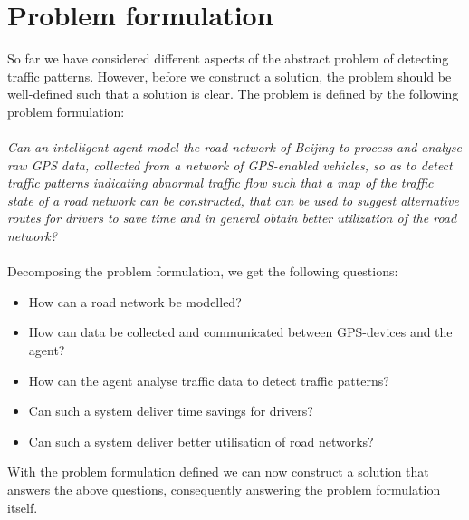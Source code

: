 \section{Problem formulation}
So far we have considered different aspects of the abstract problem of detecting traffic patterns. However, before we construct a solution, the problem should be well-defined such that a solution is clear. The problem is defined by the following problem formulation:
\\\\
\emph{Can an intelligent agent model the road network of Beijing to process and analyse raw GPS data, collected from a network of GPS-enabled vehicles, so as to detect traffic patterns indicating abnormal traffic flow such that a map of the traffic state of a road network can be constructed, that can be used to suggest alternative routes for drivers to save time and in general obtain better utilization of the road network?}
\\\\
Decomposing the problem formulation, we get the following questions:

\begin{itemize}
\item How can a road network be modelled?
\item How can data be collected and communicated between GPS-devices and the agent?
\item How can the agent analyse traffic data to detect traffic patterns?
\item Can such a system deliver time savings for drivers?
\item Can such a system deliver better utilisation of road networks?
\end{itemize}

With the problem formulation defined we can now construct a solution that answers the above questions, consequently answering the problem formulation itself.


% 